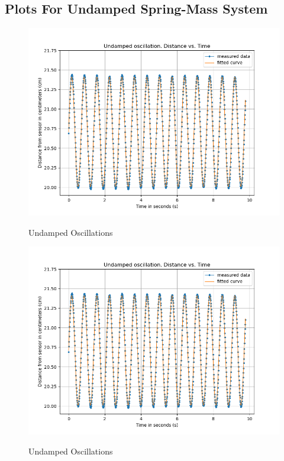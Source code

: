 \documentclass[letterpaper,12pt]{article}
\begin{document}
\subsection{Plots For Undamped Spring-Mass  System}
\begin{figure}[H]
  \centering
  \includegraphics[width=0.95\linewidth]{../Fredrik/Undamped oscillation. Distance vs. Time.png}    
  \begin{center}
    \emph{}
  \end{center}
  \caption{Undamped Oscillations}
  \label{undamped-plot}
\end{figure}

\begin{figure}[H]
  \centering
  \includegraphics[width=0.95\linewidth]{../Fredrik/Undamped oscillation. Distance vs. Time.png}    
  \begin{center}
    \emph{}
  \end{center}
  \caption{Undamped Oscillations}
  \label{undamped-sim-plot}
\end{figure}
\end{document}
